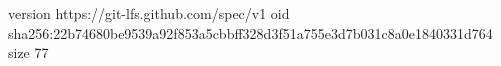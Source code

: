 version https://git-lfs.github.com/spec/v1
oid sha256:22b74680be9539a92f853a5cbbff328d3f51a755e3d7b031c8a0e1840331d764
size 77
